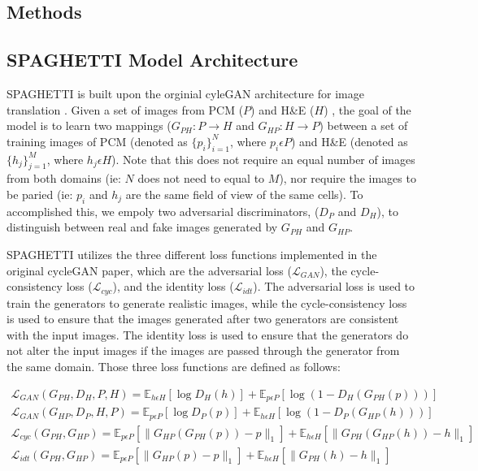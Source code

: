 \begin{refsegment}
\section*{Methods}
\subsection*{SPAGHETTI Model Architecture}
SPAGHETTI is built upon the orginial cyleGAN architecture for image translation \autocite{cyclegan2017}. Given a set of images from PCM ($P$) and H\&E ($H$) , the goal of the model is to learn two mappings ($G_{PH}: P \rightarrow H$ and $G_{HP}: H \rightarrow P$) between a set of training images of PCM (denoted as $\{p_{i}\}^{N}_{i=1}$, where $p_{i} \epsilon P$) and H\&E (denoted as $\{h_{j}\}^{M}_{j=1}$, where $h_{j} \epsilon H$). Note that this does not require an equal number of images from both domains (ie: $N$ does not need to equal to $M$), nor require the images to be paried (ie: $p_{i}$ and $h_{j}$ are the same field of view of the same cells). To accomplished this, we empoly two adversarial discriminators, ($D_{P}$ and $D_{H}$), to distinguish between real and fake images generated by $G_{PH}$ and $G_{HP}$. 

SPAGHETTI utilizes the three different loss functions implemented in the original cycleGAN paper, which are the adversarial loss ($\mathcal{L}_{GAN}$), the cycle-consistency loss ($\mathcal{L}_{cyc}$), and the identity loss ($\mathcal{L}_{idt}$). The adversarial loss is used to train the generators to generate realistic images, while the cycle-consistency loss is used to ensure that the images generated after two generators are consistent with the input images. The identity loss is used to ensure that the generators do not alter the input images if the images are passed through the generator from the same domain. Those three loss functions are defined as follows:

\begin{equation}
  \begin{aligned}
  \mathcal{L}_{GAN}(G_{PH}, D_{H}, P, H) = \mathbb{E}_{h \epsilon H}[\log D_{H}(h)] + \mathbb{E}_{p \epsilon P}[\log(1 - D_{H}(G_{PH}(p)))] \\
  \mathcal{L}_{GAN}(G_{HP}, D_{P}, H, P) = \mathbb{E}_{p \epsilon P}[\log D_{P}(p)] + \mathbb{E}_{h \epsilon H}[\log(1 - D_{P}(G_{HP}(h)))] \\
  \mathcal{L}_{cyc}(G_{PH}, G_{HP}) = \mathbb{E}_{p \epsilon P}[\|G_{HP}(G_{PH}(p)) - p\|_{1}] + \mathbb{E}_{h \epsilon H}[\|G_{PH}(G_{HP}(h)) - h\|_{1}] \\
  \mathcal{L}_{idt}(G_{PH}, G_{HP}) = \mathbb{E}_{p \epsilon P}[\|G_{HP}(p) - p\|_{1}] + \mathbb{E}_{h \epsilon H}[\|G_{PH}(h) - h\|_{1}] \\
  \end{aligned}
\end{equation}



\end{refsegment}
